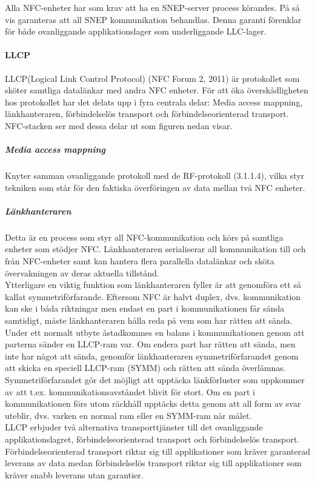 \documentclass[11pt]{article}
\begin{document}
Alla NFC-enheter har som krav att ha en SNEP-server process körandes. På så vis garanteras att all SNEP kommunikation behandlas. Denna garanti förenklar för både ovanliggande applikationslager som underliggande LLC-lager.

\paragraph{LLCP}
LLCP(Logical Link Control Protocol) (NFC Forum 2, 2011) är protokollet som sköter samtliga datalänkar med andra NFC enheter. För att öka överskådligheten hos protokollet har det delats upp i fyra centrala delar: Media access mappning, länkhanteraren, förbindelselös transport och förbindelseorienterad transport. NFC-stacken ser med dessa delar ut som figuren nedan visar.


\subparagraph{Media access mappning}
Knyter samman ovanliggande protokoll med de RF-protokoll (3.1.1.4), vilka styr tekniken som står för den faktiska överföringen av data mellan två NFC enheter. 

\subparagraph{Länkhanteraren}
Detta är en process som styr all NFC-kommunikation och körs på samtliga enheter som stödjer NFC. Länkhanteraren serialiserar all kommunikation till och från NFC-enheter samt kan hantera flera parallella datalänkar och sköta övervakningen av deras aktuella tillstånd.\\
Ytterligare en viktig funktion som länkhanteraren fyller är att genomföra ett så kallat symmetriförfarande. Eftersom NFC är halvt duplex, dvs. kommunikation kan ske i båda riktningar men endast en part i kommunikationen får sända samtidigt, måste länkhanteraren hålla reda på vem som har rätten att sända. Under ett normalt utbyte åstadkommes en balans i kommunikationen genom att parterna sänder en LLCP-ram var. Om endera part har rätten att sända, men inte har något att sända, genomför länkhanteraren symmetriförfarandet genom att skicka en speciell LLCP-ram (SYMM) och rätten att sända överlämnas. Symmetriförfarandet gör det möjligt att upptäcka länkförluster som uppkommer av att t.ex. kommunikationsavståndet blivit för stort. Om en part i kommunikationen förs utom räckhåll upptäcks detta genom att all form av svar uteblir, dvs. varken en normal ram eller en SYMM-ram når målet.\\
LLCP erbjuder två alternativa transporttjänster till det ovanliggande applikationslagret, förbindelseorienterad transport och förbindelselös transport. Förbindelseorienterad transport riktar sig till applikationer som kräver garanterad leverans av data medan förbindelselös transport riktar sig till applikationer som kräver snabb leverans utan garantier.
\end{document}
